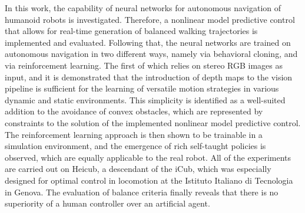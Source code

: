 In this work, the capability of neural networks for autonomous navigation of humanoid robots is investigated. Therefore, a nonlinear model predictive control that allows for real-time generation of balanced walking trajectories is implemented and evaluated. Following that, the neural networks are trained on autonomous navigation in two different ways, namely via behavioral cloning, and via reinforcement learning. The first of which relies on stereo RGB images as input, and it is demonstrated that the introduction of depth maps to the vision pipeline is sufficient for the learning of versatile motion strategies in various dynamic and static environments. This simplicity is identified as a well-suited addition to the avoidance of convex obstacles, which are represented by constraints to the solution of the implemented nonlinear model predictive control. The reinforcement learning approach is then shown to be trainable in a simulation environment, and the emergence of rich self-taught policies is observed, which are equally applicable to the real robot. All of the experiments are carried out on Heicub, a descendant of the iCub, which was especially designed for optimal control in locomotion at the Istituto Italiano di Tecnologia in Genova. The evaluation of balance criteria finally reveals that there is no superiority of a human controller over an artificial agent. 